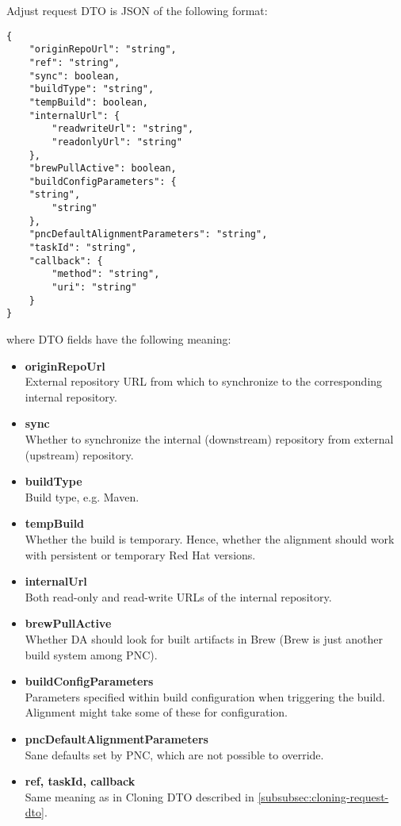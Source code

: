 \documentclass[../main.tex]{subfiles}
\begin{document}
Adjust request DTO is JSON of the following format:

\begin{lstlisting}[numbers=none]
{
    "originRepoUrl": "string",
    "ref": "string",
    "sync": boolean,
    "buildType": "string",
    "tempBuild": boolean,
    "internalUrl": {
        "readwriteUrl": "string",
        "readonlyUrl": "string"
    },
    "brewPullActive": boolean,
    "buildConfigParameters": {
	"string",
        "string"
    },
    "pncDefaultAlignmentParameters": "string",
    "taskId": "string",
    "callback": {
        "method": "string",
        "uri": "string"
    }
}
\end{lstlisting}

where DTO fields have the following meaning:
\begin{itemize}
    \item \textbf{originRepoUrl}\\
    External repository URL from which to synchronize to the corresponding internal repository.

    \item \textbf{sync}\\
    Whether to synchronize the internal (downstream) repository from external (upstream) repository.

    \item \textbf{buildType}\\
    Build type, e.g. Maven.

    \item \textbf{tempBuild}\\
    Whether the build is temporary. Hence, whether the alignment should work with persistent or temporary Red Hat versions.

    \item \textbf{internalUrl}\\
    Both read-only and read-write URLs of the internal repository.

    \item \textbf{brewPullActive}\\
    Whether DA should look for built artifacts in Brew (Brew is just another build system among PNC).

    \item \textbf{buildConfigParameters}\\
    Parameters specified within build configuration when triggering the build. Alignment might take some of these for configuration.

    \item \textbf{pncDefaultAlignmentParameters}\\
    Sane defaults set by PNC, which are not possible to override.

    \item \textbf{ref, taskId, callback}\\
    Same meaning as in Cloning DTO described in \ref{subsubsec:cloning-request-dto}.
\end{itemize}
\end{document}

